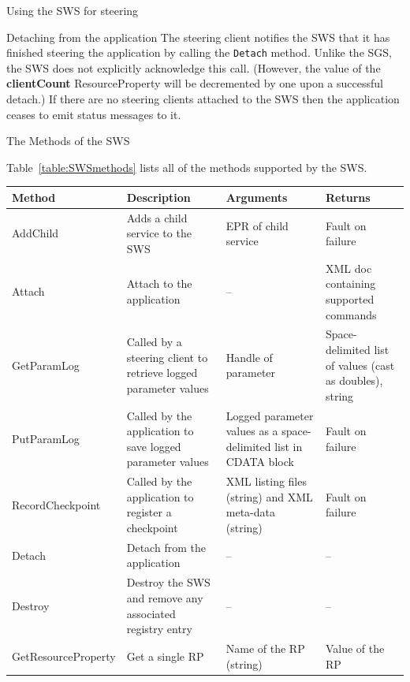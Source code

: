 \documentclass[a4paper]{article}
\begin{document}
\begin{section}{Using the SWS for steering}
\begin{subsection}{Detaching from the application}
The steering client notifies the SWS that it has finished steering the
application by calling the \texttt{Detach} method.  Unlike the SGS, the
SWS does not explicitly acknowledge this call.  (However, the value of
the {\bf clientCount} ResourceProperty will be decremented by one upon
a successful detach.)  If there are no steering clients attached to
the SWS then the application ceases to emit status messages to it.
\end{subsection}

\end{section}


\begin{section}{The Methods of the SWS}
\label{sec:swsMethods}

Table~\ref{table:SWSmethods} lists all of the methods supported by the
SWS.

\begin{table}
\begin{center}
\begin{tabular}{l|p{4cm}|p{4cm}|p{3cm}}
\hline\hline
Method & Description & Arguments & Returns\\
\hline
AddChild & Adds a child service to the SWS 
& EPR of child service  
& Fault on failure \\

Attach & Attach to the application & -- 
& XML doc containing supported commands\\

GetParamLog & Called by a steering client to retrieve logged parameter values 
& Handle of parameter 
& Space-delimited list of values (cast as doubles), string \\

PutParamLog & Called by the application to save logged parameter values 
& Logged parameter values as a space-delimited list in CDATA block
& Fault on failure \\

RecordCheckpoint & Called by the application to register a checkpoint 
& XML listing files (string) and XML meta-data (string)
& Fault on failure \\

Detach & Detach from the application & -- & --\\
\hline
Destroy & Destroy the SWS and remove any associated registry entry & -- &--\\
GetResourceProperty & Get a single RP & Name of the RP (string) 
& Value of the RP \\


\end{tabular}
\end{center}
\end{table}
\end{section}
\end{document}
